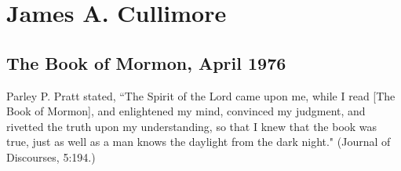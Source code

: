 \section{James A. Cullimore}

\subsection{The Book of Mormon, April 1976}

Parley P. Pratt stated, ``The Spirit of the Lord came upon me, while I read [The Book of Mormon], and enlightened my mind, convinced my judgment, and rivetted the truth upon my understanding, so that I knew that the book was true, just as well as a man knows the daylight from the dark night." (Journal of Discourses, 5:194.)